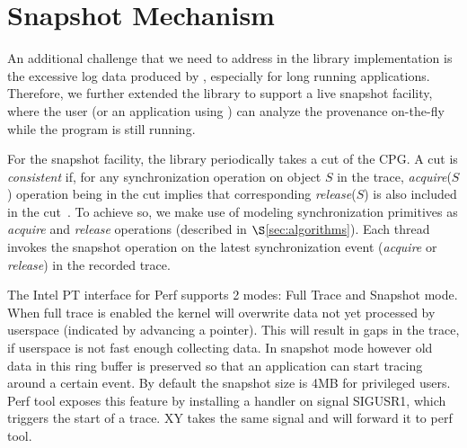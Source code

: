 \section{Snapshot Mechanism}
\label{sec:snapshot}
An additional challenge that we need to address in the library implementation is the excessive log data produced by \intelpt, especially for long running applications. Therefore, we further extended the library to support a live snapshot facility, where the user (or an application using \projecttitle) can analyze the provenance on-the-fly while the program is still running.

For the snapshot facility, the library periodically takes a cut of the CPG. A cut is {\em consistent} if, for any synchronization operation on object $S$ in the trace,  {\em acquire}($S$) operation being in the cut implies that corresponding {\em release}($S$) is also included in the cut~\cite{chandy-lamport}.  To achieve so, we make use of modeling synchronization primitives as {\em acquire} and {\em release} operations (described in $\S$\ref{sec:algorithms}). Each thread invokes the snapshot operation on the latest synchronization event ({\em acquire} or {\em release}) in the recorded trace.

The Intel PT interface for Perf supports 2 modes: Full Trace and Snapshot mode.
When full trace is enabled the kernel will overwrite data not yet processed by
userspace (indicated by advancing a pointer). This will result in gaps in the
trace, if userspace is not fast enough collecting data. In snapshot mode however
old data in this ring buffer is preserved so that an application can start
tracing around a certain event. By default the snapshot size is 4MB for
privileged users. Perf tool exposes this feature by installing a handler on
signal SIGUSR1, which triggers the start of a trace. XY takes the same signal
and will forward it to perf tool.
